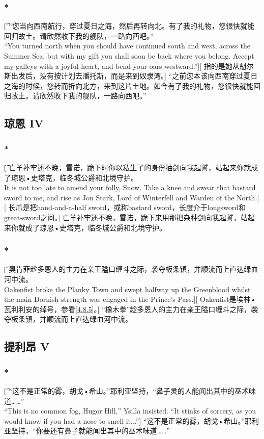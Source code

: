 \documentclass[12pt,a4paper]{article}
\begin{document}
\subsubsection{\color{red}*}\t[
	“您当向西南航行，穿过夏日之海，然后再转向北。有了我的礼物，您很快就能回归故土。请欣然收下我的舰队，一路向西吧。”\\
	“You turned north when you should have continued south and west, across the Summer Sea, but with my gift you shall soon be back where you belong. Accept my galleys with a joyful heart, and bend your oars westward.”][
	指的是她从魁尔斯出发后，没有按计划去潘托斯，而是来到奴隶湾。]
	“之前您本该向西南穿过夏日之海的时候，您转而折向北方，来到这片土地。如今有了我的礼物，您很快就能回归故土。请欣然收下我的舰队，一路向西吧。”
	
\subsection{琼恩 IV}
\subsubsection{\color{red}*}\t[
	亡羊补牢还不晚，雪诺，跪下时你以私生子的身份抽剑向我起誓，站起来你就成了琼恩•史塔克，临冬城公爵和北境守护。\\
	It is not too late to amend your folly, Snow. Take a knee and swear that bastard sword to me, and rise as Jon Stark, Lord of Winterfell and Warden of the North.][
	长爪是把hand-and-a-half sword，或称bastard sword，长度介于longsword和great-sword之间。]
	亡羊补牢还不晚，雪诺，跪下来用那把杂种剑向我起誓，站起来你就成了琼恩•史塔克，临冬城公爵和北境守护。
	
\subsubsection{\color{red}*}\t[
	奥肯菲趁多恩人的主力在亲王隘口缠斗之际，袭夺板条镇，并顺流而上直达绿血河中流。\\
	Oakenfist broke the Planky Town and swept halfway up the Greenblood whilst the main Dornish strength was engaged in the Prince's Pass.][
	Oakenfist是埃林•瓦利利安的绰号，参看\ref{4.8.5}。]
	“橡木拳”趁多恩人的主力在亲王隘口缠斗之际，袭夺板条镇，并顺流而上直达绿血河中流。
	

\subsection{提利昂 V}
\subsubsection{\color{red}*}\t[
	“这不是正常的雾，胡戈•希山。”耶利亚坚持，“鼻子灵的人能闻出其中的巫术味道……”\\
	“This is no common fog, Hugor Hill,” Ysilla insisted. “It stinks of sorcery, as you would know if you had a nose to smell it...”]
	“这不是正常的雾，胡戈•希山。”耶利亚坚持，“你要还有鼻子就能闻出其中的巫术味道……”
	
\end{document}

